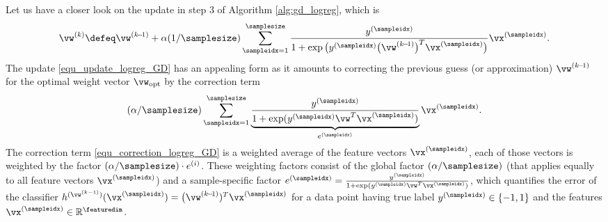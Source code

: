 \documentclass[12pt]{report}
\begin{document}
Let us have a closer look on the update in step $3$ of Algorithm \ref{alg:gd_logreg}, which is 
\begin{equation}
\label{equ_update_logreg_GD}
\vw^{(k)} \defeq \vw^{(k\!-\!1)} + \alpha (1/\samplesize) \sum_{\sampleidx=1}^{\samplesize} \frac{y^{(\sampleidx)}}{1 + \exp \big( y^{(\sampleidx)} \big( \vw^{(k\!-\!1)}  \big)^{T} \vx^{(\sampleidx)}\big)} \vx^{(\sampleidx)}. 
\end{equation}
The update \eqref{equ_update_logreg_GD} has an appealing form as it amounts to correcting the previous 
guess (or approximation) $\vw^{(k\!-\!1)}$ for the optimal weight vector $\vw_{\rm opt}$ by the correction term 
\begin{equation}
\label{equ_correction_logreg_GD}
(\alpha/\samplesize) \sum_{\sampleidx=1}^{\samplesize} \underbrace{ \frac{y^{(\sampleidx)}}{1 + \exp ( y^{(\sampleidx)} \vw^{T} \vx^{(\sampleidx)})}}_{e^{(\sampleidx)}} \vx^{(\sampleidx)}. 
\end{equation}
The correction term \eqref{equ_correction_logreg_GD} is a weighted average of the feature vectors $\vx^{(\sampleidx)}$, 
each of those vectors is weighted by the factor $(\alpha/\samplesize) \cdot e^{(i)}$. These weighting factors consist of 
the global factor $(\alpha/\samplesize)$ (that applies equally to all feature vectors $\vx^{(\sampleidx)}$) and a sample-specific 
factor $e^{(\sampleidx)} =  \frac{y^{(\sampleidx)}}{1 + \exp ( y^{(\sampleidx)} \vw^{T} \vx^{(\sampleidx)})}$, which quantifies 
the error of the classifier  $h^{(\vw^{(k-1)})}(\vx^{(\sampleidx)}) =   \big(\vw^{(k\!-\!1)})^{T} \vx^{(\sampleidx)}$ for a data point 
having true label $y^{(\sampleidx)} \in \{-1,1\}$ and the features $\vx^{(\sampleidx)} \in \mathbb{R}^{\featuredim}$. 
\end{document}
